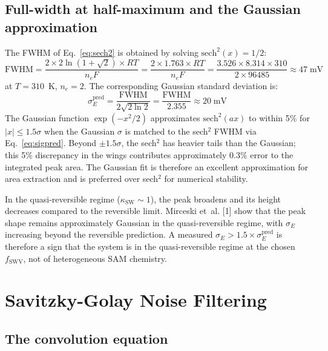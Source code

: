 \documentclass[10pt,a4paper]{article}
\numberwithin{equation}{section}
\newcommand{\cit}[1]{[#1]}
\begin{document}
\subsection{Full-width at half-maximum and the Gaussian approximation}

The FWHM of Eq.~\eqref{eq:sech2} is obtained by solving $\text{sech}^2(x) = 1/2$:
\begin{equation}
  \text{FWHM} = \frac{2 \times 2\ln(1+\sqrt{2}) \times RT}{n_e F}
  = \frac{2 \times 1.763 \times RT}{n_e F}
  = \frac{3.526 \times 8.314 \times 310}{2 \times 96485}
  \approx 47\;\text{mV}
  \label{eq:fwhm}
\end{equation}
at $T = 310$~K, $n_e = 2$. The corresponding Gaussian standard deviation is:
\begin{equation}
  \sigma_E^\text{pred} = \frac{\text{FWHM}}{2\sqrt{2\ln 2}}
  = \frac{\text{FWHM}}{2.355}
  \approx 20\;\text{mV}
  \label{eq:sigpred}
\end{equation}
The Gaussian function $\exp(-x^2/2)$ approximates $\text{sech}^2(ax)$ to
within 5\% for $|x| \leq 1.5\sigma$ when the Gaussian $\sigma$ is matched to
the sech$^2$ FWHM via Eq.~\eqref{eq:sigpred}. Beyond $\pm 1.5\sigma$, the
sech$^2$ has heavier tails than the Gaussian; this 5\% discrepancy in the
wings contributes approximately $0.3\%$ error to the integrated peak area.
The Gaussian fit is therefore an excellent approximation for area extraction
and is preferred over sech$^2$ for numerical stability.

In the quasi-reversible regime ($\kappa_\text{SW} \sim 1$), the peak broadens
and its height decreases compared to the reversible limit. Mirceski et~al.
\cit{1} show that the peak shape remains approximately Gaussian in the
quasi-reversible regime, with $\sigma_E$ increasing beyond the reversible
prediction. A measured $\sigma_E > 1.5 \times \sigma_E^\text{pred}$ is
therefore a sign that the system is in the quasi-reversible regime at the
chosen $f_\text{SWV}$, not of heterogeneous SAM chemistry.

\section{Savitzky-Golay Noise Filtering}
\label{sec:sg}

\subsection{The convolution equation}
\end{document}
